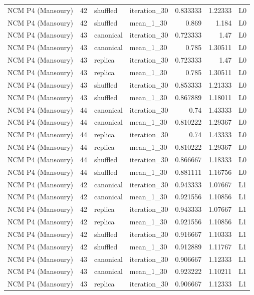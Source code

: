 \begin{table}[htbp!]
\begin{tabular}{lrllrrl}
NCM P4 (Mansoury) & 42 & shuffled & iteration\_30 & 0.833333 & 1.22333 & L0 \\
NCM P4 (Mansoury) & 42 & shuffled & mean\_1\_30 & 0.869 & 1.184 & L0 \\
NCM P4 (Mansoury) & 43 & canonical & iteration\_30 & 0.723333 & 1.47 & L0 \\
NCM P4 (Mansoury) & 43 & canonical & mean\_1\_30 & 0.785 & 1.30511 & L0 \\
NCM P4 (Mansoury) & 43 & replica & iteration\_30 & 0.723333 & 1.47 & L0 \\
NCM P4 (Mansoury) & 43 & replica & mean\_1\_30 & 0.785 & 1.30511 & L0 \\
NCM P4 (Mansoury) & 43 & shuffled & iteration\_30 & 0.853333 & 1.21333 & L0 \\
NCM P4 (Mansoury) & 43 & shuffled & mean\_1\_30 & 0.867889 & 1.18011 & L0 \\
NCM P4 (Mansoury) & 44 & canonical & iteration\_30 & 0.74 & 1.43333 & L0 \\
NCM P4 (Mansoury) & 44 & canonical & mean\_1\_30 & 0.810222 & 1.29367 & L0 \\
NCM P4 (Mansoury) & 44 & replica & iteration\_30 & 0.74 & 1.43333 & L0 \\
NCM P4 (Mansoury) & 44 & replica & mean\_1\_30 & 0.810222 & 1.29367 & L0 \\
NCM P4 (Mansoury) & 44 & shuffled & iteration\_30 & 0.866667 & 1.18333 & L0 \\
NCM P4 (Mansoury) & 44 & shuffled & mean\_1\_30 & 0.881111 & 1.16756 & L0 \\
NCM P4 (Mansoury) & 42 & canonical & iteration\_30 & 0.943333 & 1.07667 & L1 \\
NCM P4 (Mansoury) & 42 & canonical & mean\_1\_30 & 0.921556 & 1.10856 & L1 \\
NCM P4 (Mansoury) & 42 & replica & iteration\_30 & 0.943333 & 1.07667 & L1 \\
NCM P4 (Mansoury) & 42 & replica & mean\_1\_30 & 0.921556 & 1.10856 & L1 \\
NCM P4 (Mansoury) & 42 & shuffled & iteration\_30 & 0.916667 & 1.10333 & L1 \\
NCM P4 (Mansoury) & 42 & shuffled & mean\_1\_30 & 0.912889 & 1.11767 & L1 \\
NCM P4 (Mansoury) & 43 & canonical & iteration\_30 & 0.906667 & 1.12333 & L1 \\
NCM P4 (Mansoury) & 43 & canonical & mean\_1\_30 & 0.923222 & 1.10211 & L1 \\
NCM P4 (Mansoury) & 43 & replica & iteration\_30 & 0.906667 & 1.12333 & L1 \\

\end{tabular}
\end{table}
